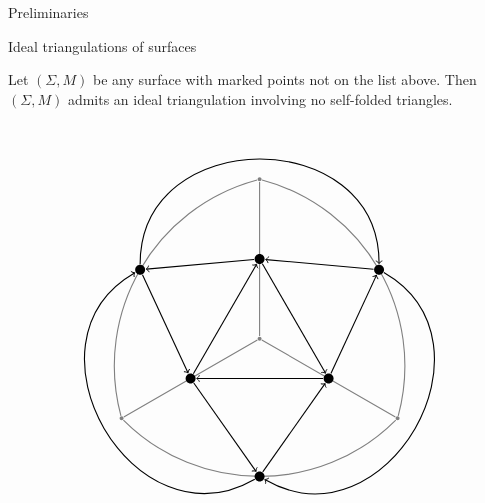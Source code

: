 \begin{chapter}{Preliminaries}
\begin{section}{Ideal triangulations of surfaces}
\begin{prop} Let $(\Sigma, M)$ be any surface with marked points not on the list above. Then $(\Sigma, M)$ admits an ideal triangulation involving no self-folded triangles. \hfill\qedsymbol
\end{prop}

\[
\begin{tikzpicture}[thick]
\tikzstyle{every node} = [circle, fill=gray, minimum size=.1cm, inner sep=0cm]
\node (c) at (0,0) {};
\node (n) at (0,4) {};
\node (sw) at (210:4) {};
\node (se) at (330:4) {};
\draw[gray] (c) -- (sw)
	(c) -- (n)
	(c) -- (se)
	(sw) to [bend right = 45] coordinate[midway](m1) (se)
	(n) to [bend right = 45] coordinate[midway](m2) (sw)
	(se) to [bend right = 45] coordinate[midway](m3) (n);
\tikzstyle{every node} = [circle, fill=black, minimum size=.25cm, inner sep=0cm]
\node (in) at (0,2) {};
\node (isw) at (210:2) {};
\node (ise) at (330:2) {};
\node (os) at (m1) {};
\node (onw) at (m2) {};
\node (one) at (m3) {};
\draw[->] (in) -- (onw);
\draw[->] (onw) -- (isw);
\draw[->] (isw) -- (in);
\draw[->] (in) -- (ise);
\draw[->] (ise) -- (isw);
\draw[->] (ise) -- (one);
\draw[->] (one) -- (in);
\draw[->] (isw) -- (os);
\draw[->] (os) -- (ise);
\draw[->] (one) to [bend left=90, distance=100] (os);
\draw[->] (onw) to [bend left=90, distance=100] (one);
\draw[->] (os) to [bend left=90, distance=100] (onw);
\end{tikzpicture}
\]
\end{section}
\end{chapter}